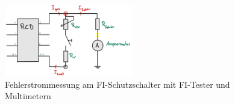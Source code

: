 \begin{enumerate}[label=\alph*)]
	\begin{figure}[h!]
		\begin{center}
			\includegraphics[width=0.5\textwidth]{img/img2.2.3.png}
		\end{center}
		\caption{Fehlerstrommessung am FI-Schutzschalter mit FI-Tester und Multimetern}\label{img2.2.3}
	\end{figure}
  \pagebreak
	

	

\end{enumerate}
